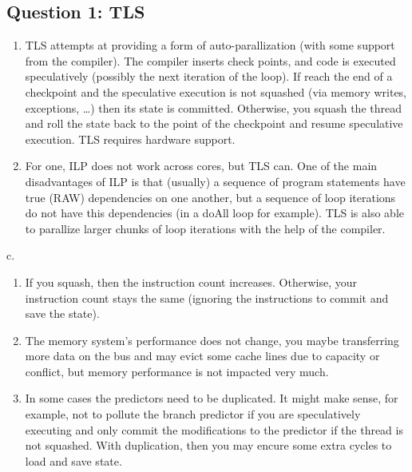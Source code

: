 \subsection{Question 1: TLS}\label{question-1-tls}

\begin{enumerate}
\def\labelenumi{\alph{enumi}.}
\item
  TLS attempts at providing a form of auto-parallization (with some
  support from the compiler). The compiler inserts check points, and
  code is executed speculatively (possibly the next iteration of the
  loop). If reach the end of a checkpoint and the speculative execution
  is not squashed (via memory writes, exceptions, \ldots{}) then its
  state is committed. Otherwise, you squash the thread and roll the
  state back to the point of the checkpoint and resume speculative
  execution. TLS requires hardware support.
\item
  For one, ILP does not work across cores, but TLS can. One of the main
  disadvantages of ILP is that (usually) a sequence of program
  statements have true (RAW) dependencies on one another, but a sequence
  of loop iterations do not have this dependencies (in a doAll loop for
  example). TLS is also able to parallize larger chunks of loop
  iterations with the help of the compiler.
\end{enumerate}

c.

\begin{enumerate}
\def\labelenumi{\arabic{enumi}.}
\item
  If you squash, then the instruction count increases. Otherwise, your
  instruction count stays the same (ignoring the instructions to commit
  and save the state).
\item
  The memory system's performance does not change, you maybe
  transferring more data on the bus and may evict some cache lines due
  to capacity or conflict, but memory performance is not impacted very
  much.
\item
  In some cases the predictors need to be duplicated. It might make
  sense, for example, not to pollute the branch predictor if you are
  speculatively executing and only commit the modifications to the
  predictor if the thread is not squashed. With duplication, then you
  may encure some extra cycles to load and save state.
\end{enumerate}

